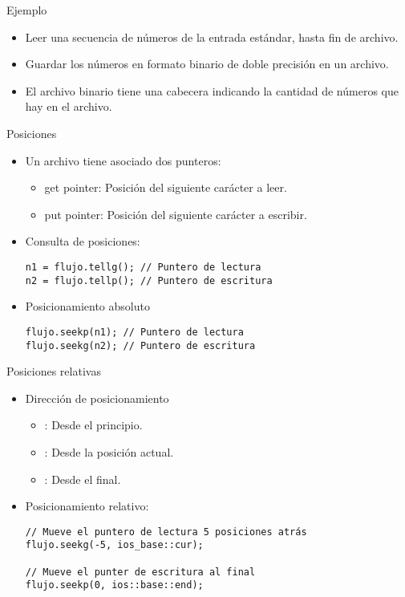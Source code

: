 \begin{frame}[t]{Ejemplo}
\begin{itemize}
  \item Leer una secuencia de números de la entrada estándar, hasta fin de archivo.
  \item Guardar los números en formato binario de doble precisión en un archivo.
  \item El archivo binario tiene una cabecera indicando la cantidad de números que hay en el archivo.
\end{itemize}
\end{frame}

\begin{frame}[fragile]{Posiciones}
\begin{itemize}
  \item Un archivo tiene asociado dos punteros:
    \begin{itemize}
      \item \alert{get pointer}: Posición del siguiente carácter a leer.
      \item \alert{put pointer}: Posición del siguiente carácter a escribir.
    \end{itemize}
  \item Consulta de posiciones:
\begin{lstlisting}
n1 = flujo.tellg(); // Puntero de lectura
n2 = flujo.tellp(); // Puntero de escritura
\end{lstlisting}
  \item Posicionamiento absoluto
\begin{lstlisting}
flujo.seekp(n1); // Puntero de lectura
flujo.seekg(n2); // Puntero de escritura
\end{lstlisting}
\end{itemize}
\end{frame}

\begin{frame}[fragile]{Posiciones relativas}
\begin{itemize}
  \item Dirección de posicionamiento
    \begin{itemize}
      \item {}: Desde el principio.
      \item {}: Desde la posición actual.
      \item {}: Desde el final.
    \end{itemize}
  \item Posicionamiento relativo:
\begin{lstlisting}
// Mueve el puntero de lectura 5 posiciones atrás 
flujo.seekg(-5, ios_base::cur);

// Mueve el punter de escritura al final
flujo.seekp(0, ios::base::end); 
\end{lstlisting}
\end{itemize}
\end{frame}
